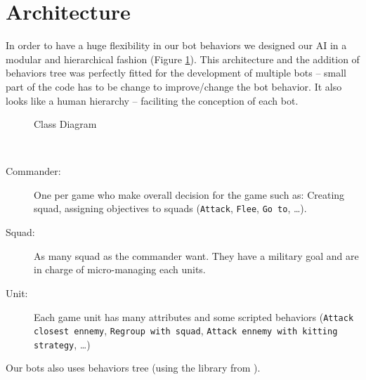 \section{Architecture}

In order to have a huge flexibility in our bot behaviors we designed our AI in a modular and hierarchical fashion (Figure \ref{classDiag}).
This architecture and the addition of behaviors tree was perfectly fitted for the development of multiple bots -- small part of the code has to be change to improve/change the bot behavior.
It also looks like a human hierarchy -- faciliting the conception of each bot.

\begin{figure}[h!t]
\centering
{}
\caption{Class Diagram}
\label{classDiag}
\end{figure}

\begin{definition}
    \ \\
    \begin{description}
        \item[Commander:]  One per game who make overall decision for the game such as: Creating squad, assigning objectives to squads (\texttt{Attack}, \texttt{Flee}, \texttt{Go to}, \ldots).
        \item[Squad:] As many squad as the commander want. They have a military goal and are in charge of micro-managing each units. 
        \item[Unit:] Each game unit has many attributes and some scripted behaviors (\texttt{Attack closest ennemy}, \texttt{Regroup with squad}, \texttt{Attack ennemy with kitting strategy}, \ldots)
    \end{description}
\end{definition}

Our bots also uses behaviors tree (using the library from \cite{libbehavior}). 

